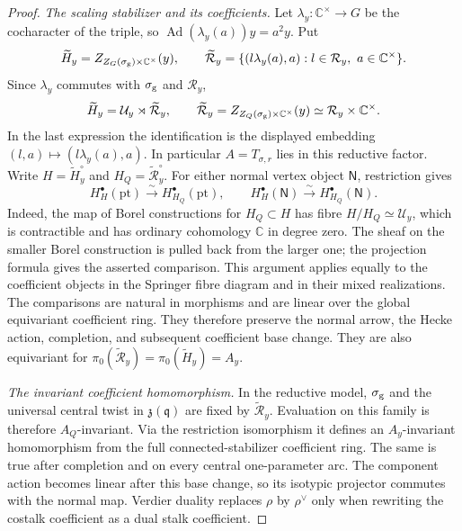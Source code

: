 \documentclass[11pt]{amsart}
\theoremstyle{definition}
\theoremstyle{remark}
\begin{document}
\begin{proof}
\smallskip
\emph{The scaling stabilizer and its coefficients.}
Let $\lambda_y:\mathbb C^\times\to G$ be the cocharacter of the
triple, so $\operatorname{Ad}(\lambda_y(a))y=a^2y$.  Put
\[
 \widetilde H_y=Z_{Z_G(\sigma_{\rm g})\times\mathbb C^\times}(y),
 \qquad
 \widetilde{\mathcal R}_y
 =\{(l\lambda_y(a),a):l\in\mathcal R_y,\ a\in\mathbb C^\times\}.
\]
Since $\lambda_y$ commutes with $\sigma_{\rm g}$ and $\mathcal R_y$,
\[
 \widetilde H_y=\mathcal U_y\rtimes\widetilde{\mathcal R}_y,
 \qquad
 \widetilde{\mathcal R}_y
 =Z_{Z_Q(\sigma_{\rm g})\times\mathbb C^\times}(y)
 \simeq\mathcal R_y\times\mathbb C^\times.
\]
In the last expression the identification is the displayed embedding
$(l,a)\mapsto(l\lambda_y(a),a)$.
In particular $A=T_{\sigma,r}$ lies in this reductive factor.
Write $H=\widetilde H_y^\circ$ and
$H_Q=\widetilde{\mathcal R}_y^\circ$.
For either normal vertex object $\mathsf N$, restriction gives
\[
 H_H^\bullet(\mathrm{pt})\xrightarrow{\sim}
 H_{H_Q}^\bullet(\mathrm{pt}),\qquad
 H_H^\bullet(\mathsf N)\xrightarrow{\sim}
 H_{H_Q}^\bullet(\mathsf N).
\]
Indeed, the map of Borel constructions for $H_Q\subset H$ has
fibre $H/H_Q\simeq\mathcal U_y$, which is contractible and has
ordinary cohomology $\mathbb C$ in degree zero.  The sheaf on the
smaller Borel construction is pulled back from the larger one;
the projection formula gives the asserted comparison.  This
argument applies equally to the coefficient objects in the Springer
fibre diagram and in their mixed realizations.  The comparisons are
natural in morphisms and are linear over the global equivariant
coefficient ring.  They therefore preserve the normal arrow,
the Hecke action, completion, and subsequent coefficient base change.
They are also equivariant for
$\pi_0(\widetilde{\mathcal R}_y)=\pi_0(\widetilde H_y)=A_y$.

\smallskip
\emph{The invariant coefficient homomorphism.}
In the reductive model, $\sigma_{\rm g}$ and the universal central
twist in $\mathfrak z(\mathfrak q)$ are fixed by
$\widetilde{\mathcal R}_y$.  Evaluation on this family is therefore
$A_Q$-invariant.  Via the restriction isomorphism it defines an
$A_y$-invariant homomorphism from the full connected-stabilizer
coefficient ring.  The same is true after completion and on every
central one-parameter arc.  The component action becomes linear
after this base change, so its isotypic projector commutes with the
normal map.  Verdier duality replaces $\rho$ by $\rho^\vee$ only
when rewriting the costalk coefficient as a dual stalk coefficient.
\end{proof}
\end{document}
